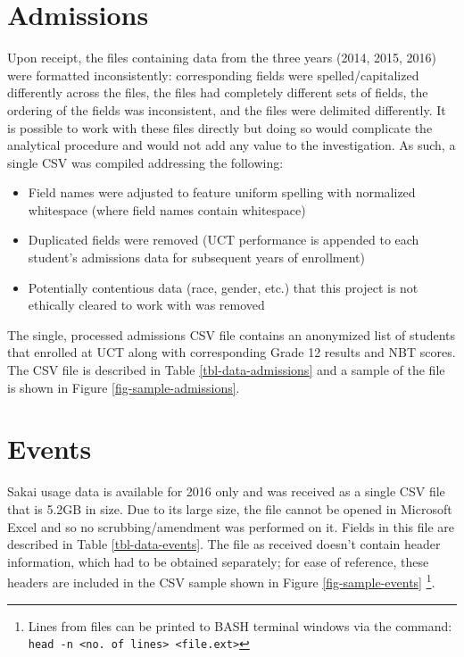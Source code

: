 


\section{Admissions}
Upon receipt, the files containing data from the three years (2014, 2015, 2016) were formatted inconsistently: corresponding fields were spelled/capitalized differently across the files, the files had completely different sets of fields, the ordering of the fields was inconsistent, and the files were delimited differently. It is possible to work with these files directly but doing so would complicate the analytical procedure and would not add any value to the investigation. As such, a single CSV was compiled addressing the following:

\begin{itemize}
    \item Field names were adjusted to feature uniform spelling with normalized whitespace (where field names contain whitespace)
    \item Duplicated fields were removed (UCT performance is appended to each student's admissions data for subsequent years of enrollment)
    \item Potentially contentious data (race, gender, etc.) that this project is not ethically cleared to work with was removed
\end{itemize}

The single, processed admissions CSV file contains an anonymized list of students that enrolled at UCT along with corresponding Grade 12 results and NBT scores. The CSV file is described in Table \ref{tbl-data-admissions} and a sample of the file is shown in Figure \ref{fig-sample-admissions}.

\section{Events}
Sakai usage data is available for 2016 only and was received as a single CSV file that is 5.2GB in size. Due to its large size, the file cannot be opened in Microsoft Excel and so no scrubbing/amendment was performed on it. Fields in this file are described in Table \ref{tbl-data-events}. The file as received doesn't contain header information, which had to be obtained separately; for ease of reference, these headers are included in the CSV sample shown in Figure \ref{fig-sample-events} \footnote{Lines from files can be printed to BASH terminal windows via the command: \texttt{head -n <no. of lines> <file.ext>}}.





